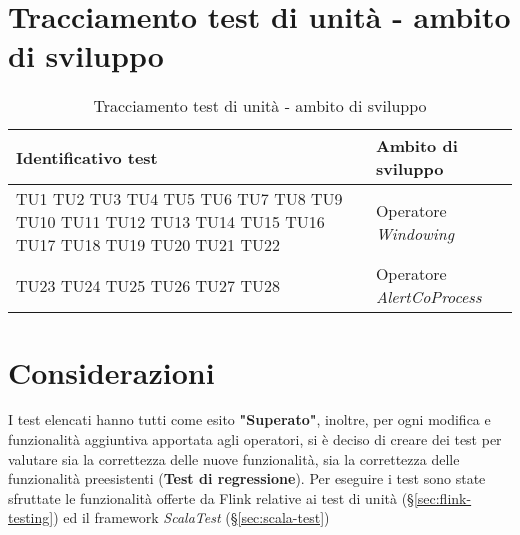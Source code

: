 \section{Tracciamento test di unità - ambito di sviluppo}
{
\centering
\begin{longtable}{L{5cm} L{8.5cm}}
\caption{Tracciamento test di unità - ambito di sviluppo}\\
\textbf{Identificativo test} &
\textbf{Ambito di sviluppo}\\
\endhead
\hline

TU1 \newline TU2 \newline TU3 \newline TU4 \newline TU5 \newline TU6 \newline TU7 \newline TU8 \newline TU9 \newline TU10 \newline TU11 \newline TU12 \newline TU13 \newline TU14 \newline TU15 \newline TU16 \newline TU17 \newline TU18 \newline TU19 \newline TU20 \newline TU21 \newline TU22 & Operatore \textit{Windowing} \\
\hline
TU23 \newline TU24 \newline TU25 \newline TU26 \newline TU27 \newline TU28 & Operatore \textit{AlertCoProcess} \\
\hline
\end{longtable}
}


\section{Considerazioni}
I test elencati hanno tutti come esito \textbf{"Superato"}, inoltre, per ogni modifica e funzionalità aggiuntiva apportata agli operatori, si è deciso di creare dei test per valutare sia la correttezza delle nuove funzionalità, sia la correttezza delle funzionalità preesistenti (\textbf{Test di regressione}). Per eseguire i test sono state sfruttate le funzionalità offerte da Flink relative ai test di unità (\S\ref{sec:flink-testing}) ed il \gls{framework} \textit{ScalaTest} (\S\ref{sec:scala-test})